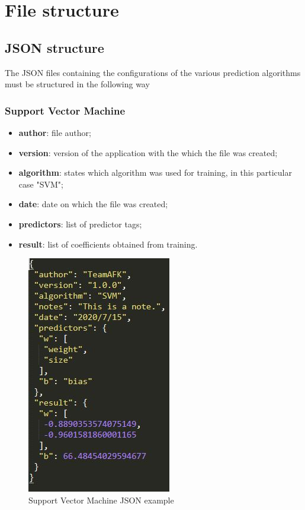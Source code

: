 \section{File structure}
\subsection{JSON structure}
The JSON files containing the configurations of the various prediction algorithms must be structured in the following way

\subsubsection{Support Vector Machine}
\begin{itemize}
	\item \textbf{author}: file author;
	\item \textbf{version}: version of the application with the which the file was created;
	\item \textbf{algorithm}: states which algorithm was used for training, in this particular case "SVM";
	\item \textbf{date}: date on which the file was created;
	\item \textbf{predictors}: list of predictor tags;
	\item \textbf{result}: list of coefficients obtained from training.
\end{itemize}
\begin{figure}[H]
\centering
\includegraphics[scale=0.65]{img/json/jsonSVM.JPG}
\caption{Support Vector Machine JSON example}
\end{figure}
\newpage


